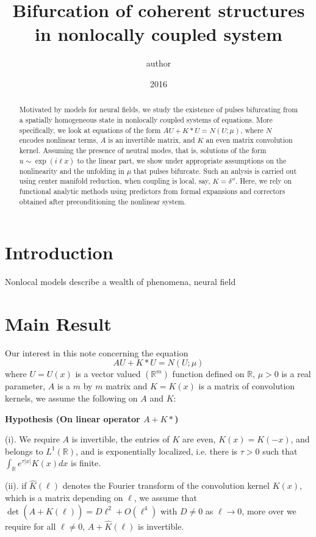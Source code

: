 \documentclass[letterpaper,11pt]{article}
\title{Bifurcation of coherent structures in nonlocally coupled system}
\author{author}
\date{2016}
\newcommand{\R}{\mathbb{R}}
\numberwithin{equation}{section}
\newenvironment{Hypothesis}[1]%
  {\begin{trivlist}\item[]{\bf Hypothesis #1 }\em}{\end{trivlist}}
\theoremstyle{plain}
\begin{document}
\maketitle
\begin{abstract}

Motivated by models for neural fields, we study the existence of pulses  bifurcating from a spatially homogeneous state in nonlocally coupled systems of equations. More specifically, we look at equations of the form $AU + K*U = N(U;\mu)$, where $N$ encodes nonlinear terms, $A$ is an invertible matrix, and $K$ an even matrix convolution kernel. Assuming the presence of neutral modes, that is, solutions of the form $u\sim \exp(i \ell x)$ to the linear part, we show under appropriate assumptions on the nonlinearity and the unfolding in $\mu$ that pulses bifurcate. Such an anlysis is carried out using center manifold reduction, when coupling is local, say, $K=\delta''$. Here, we rely on functional analytic methods using predictors from formal expansions and correctors obtained after preconditioning the nonlinear system.
\end{abstract}


\section{Introduction}

Nonlocal models describe a wealth of phenomena, neural field


\section{Main Result}
Our interest in this note concerning the equation
\begin{equation} \label{system}
AU+K\ast U = N(U;\mu) 
\end{equation}
where $U=U(x)$ is a vector valued $(\R^m)$ function defined on $\R$, $\mu > 0$ is a real parameter, $A$ is a $m$ by $m$ matrix and $K=K(x)$ is a matrix of convolution kernels, we assume the following on $A$ and $K$:

\begin{Hypothesis}{(On linear operator $A+K\ast$)}
\item (i).  We require $A$ is invertible, the entries of $K$ are even, $K(x)=K(-x)$, and belongs to $L^1(\R)$,  and is exponentially localized, i.e. there is  $\tau >0$ such that $\int_{\R}e^{\tau|x|}K(x)dx$ is finite. 
\item [(ii).] if $\hat{K}(\ell)$ denotes the Fourier transform of the convolution kernel $K(x)$, which is a matrix depending on $\ell$, we assume that $\det(A+\widehat{K}(\ell)) = D\ell^2 + O(\ell^4)$ with $D \neq 0$ as $\ell \to 0$, more over we require for all $\ell\neq 0$, $A+\hat{K}(\ell)$ is invertible. 
\end{Hypothesis}
\end{document}
